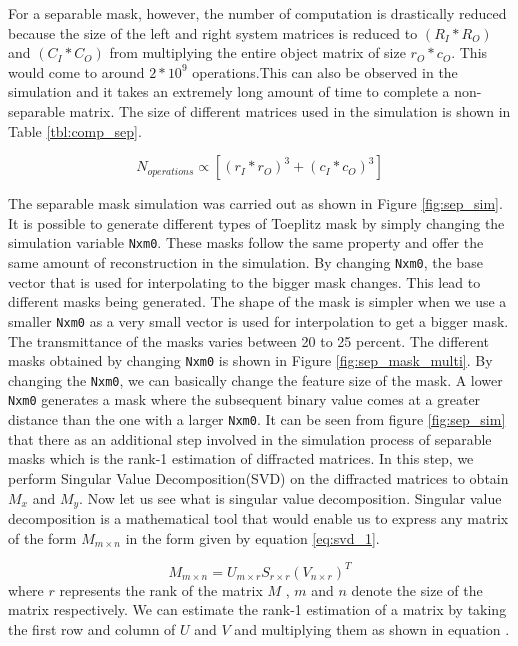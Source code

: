 For a separable mask, however, the number of computation is drastically reduced because the size of the left and right system matrices is reduced to $(R_I*R_O)$ and $(C_I*C_O)$ from multiplying the entire object matrix of size $r_O*c_O$. This would come to around $2*10^9$ operations.This can also be observed in the simulation and it takes an extremely long amount of time to complete a non-separable matrix. The size of different matrices used in the simulation is shown in Table \ref{tbl:comp_sep}.

\begin{equation}
N_{operations} \propto [(r_I*r_O)^3 + (c_I*c_O)^3] 
\label{eq:sep_comp}
\end{equation}

The separable mask simulation was carried out as shown in Figure \ref{fig:sep_sim}. It is possible to generate different types of Toeplitz mask by simply changing the simulation variable \texttt{Nxm0}. These masks follow the same property and offer the same amount of reconstruction in the simulation. By changing \texttt{Nxm0}, the base vector that is used for interpolating to the bigger mask changes. This lead to different masks being generated. The shape of the mask is simpler when we use a smaller \texttt{Nxm0} as a very small vector is used for interpolation to get a bigger mask. The transmittance of the masks varies between 20 to 25 percent. The different masks obtained by changing \texttt{Nxm0} is shown in Figure \ref{fig:sep_mask_multi}. By changing the \texttt{Nxm0}, we can basically change the feature size of the mask. A lower \texttt{Nxm0} generates a mask where the subsequent binary value comes at a greater distance than the one with a larger \texttt{Nxm0}. It can be seen from figure \ref{fig:sep_sim} that there as an additional step involved in the simulation process of separable masks which is the rank-1 estimation of diffracted matrices. In this step, we perform Singular Value Decomposition(SVD) on the diffracted matrices to obtain $M_x$ and $M_y$. Now let us see what is singular value decomposition. Singular value decomposition is a mathematical tool that would enable us to express any matrix of the form $M_{ m \times n}$ in the form given by equation \ref{eq:svd_1}\cite{svd}. 

\begin{equation}
\label{eq:svd_1}
M_{m \times n} = U_{m \times r}S_{r\times r}(V_{n \times r})^T
\end{equation}
where $r$ represents the rank of the matrix $M$ , $m$ and $n$ denote the size of the matrix respectively. We can estimate the rank-1 estimation of a matrix by taking the first row and column of $U$ and $V$ and multiplying them as shown in equation \label{eq:svd_2}.

